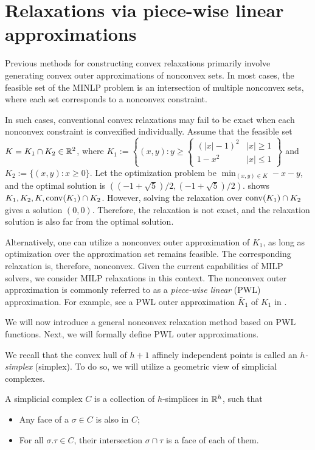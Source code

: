 \section{Relaxations via piece-wise linear approximations}

Previous methods for constructing convex relaxations primarily involve generating convex outer approximations of nonconvex sets. In most cases, the feasible set of the MINLP problem is an intersection of multiple nonconvex sets, where each set corresponds to a nonconvex constraint.

In such cases, conventional convex relaxations may fail to be exact when each nonconvex constraint is convexified individually.
Assume that the feasible set  $K = K_1 \cap K_2 \in \mathbb R^2$, where $K_1 := \left \{(x,y): y \ge \begin{cases}(|x|-1)^2 & |x| \ge 1 \\  1 - x^2 & |x| \le 1\end{cases} \right \}$ and $K_2 := \{(x,y): x \ge 0\}$. Let the optimization problem be $\min_{(x,y) \in K} -x -y $, and the optimal solution is $((-1+\sqrt{5})/2,(-1+\sqrt{5})/2)$.  shows  $K_1, K_2,K, \operatorname{conv}(K_1) \cap K_2$. However, solving the relaxation  over $\operatorname{conv}(K_1) \cap K_2$ gives  a solution $(0,0)$. Therefore, the relaxation is not  exact, and the relaxation solution is also far from the optimal solution.


Alternatively, one can utilize a nonconvex outer approximation of $K_1$, as long as optimization over the approximation set remains feasible. The corresponding relaxation is, therefore, nonconvex. Given the current capabilities of MILP solvers, we consider MILP relaxations in this context. The nonconvex outer approximation is commonly referred to as a \emph{piece-wise linear} (PWL) approximation. For example, see a PWL outer approximation $\bar{K}_1$ of $K_1$ in .

We will now introduce a general nonconvex relaxation method based on PWL functions.
Next, we will formally define PWL outer approximations.

We recall that the convex hull of $h+1$ affinely independent points is called an  \emph{$h$-simplex} (simplex).
To do so, we will utilize a geometric view of simplicial complexes.

\begin{definition}
    A simplicial complex $C$ is  a collection of $h$-simplices in $\mathbb R^h$, such that
    \begin{itemize}
        \item Any face of a $\sigma \in C$  is also in $C$;
        \item For all $\sigma.\tau \in C$, their intersection $\sigma \cap \tau$ is a face of each of them.
    \end{itemize}
\end{definition}

